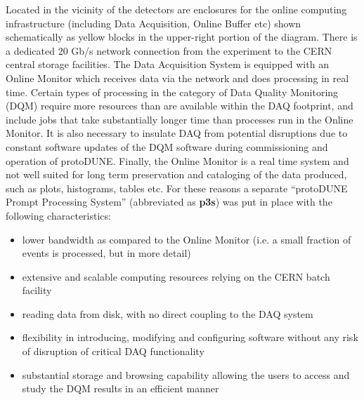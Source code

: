 \documentclass{webofc}
\newcommand{\pd}{protoDUNE\xspace}
\begin{document}
 Located in the vicinity of the detectors are enclosures for the online computing infrastructure
(including Data Acquisition, Online Buffer etc) shown schematically as yellow blocks in the upper-right
portion of  the diagram. There is a dedicated 20 Gb/s network connection from the experiment
to the CERN central storage facilities.
The Data Acquisition System is equipped with an Online Monitor which receives data via the network
and does processing in real time.
Certain types of processing in the category of Data Quality Monitoring (DQM)
require more resources than are available within the DAQ footprint, and include jobs that take substantially
longer time than processes run in the Online Monitor. It is also necessary to insulate DAQ from
potential disruptions due to constant software updates of the DQM software during commissioning
and operation of \pd. Finally, the Online Monitor is a real time system and not well suited for long term
preservation and cataloging of the data produced, such as plots, histograms, tables etc.
For these reasons a separate ``\pd Prompt Processing System'' (abbreviated as \textbf{p3s}) was put
in place \cite{eps} with the following characteristics:
\begin{itemize} 

\item lower bandwidth as compared to the Online Monitor (i.e. a small fraction of events is processed,
but in more detail)

\item extensive and scalable computing resources relying on the CERN batch facility

\item reading data from disk, with no direct coupling to the DAQ system

\item flexibility in introducing, modifying and configuring software without any risk of disruption of
critical DAQ functionality

\item substantial storage and browsing capability allowing the users to access and study
the DQM results in an efficient manner

\end{itemize}
\end{document}
